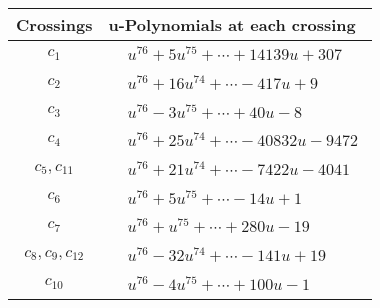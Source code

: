 \documentclass[1p]{elsarticle_modified}
\theoremstyle{definition}
\begin{document}
\begin{tabular}{m{50pt}|m{274pt}}
Crossings & \hspace{64pt}u-Polynomials at each crossing \\
\hline $$\begin{aligned}c_{1}\end{aligned}$$&$\begin{aligned}
&u^{76}+5 u^{75}+\cdots+14139 u+307
\end{aligned}$\\
\hline $$\begin{aligned}c_{2}\end{aligned}$$&$\begin{aligned}
&u^{76}+16 u^{74}+\cdots-417 u+9
\end{aligned}$\\
\hline $$\begin{aligned}c_{3}\end{aligned}$$&$\begin{aligned}
&u^{76}-3 u^{75}+\cdots+40 u-8
\end{aligned}$\\
\hline $$\begin{aligned}c_{4}\end{aligned}$$&$\begin{aligned}
&u^{76}+25 u^{74}+\cdots-40832 u-9472
\end{aligned}$\\
\hline $$\begin{aligned}c_{5},c_{11}\end{aligned}$$&$\begin{aligned}
&u^{76}+21 u^{74}+\cdots-7422 u-4041
\end{aligned}$\\
\hline $$\begin{aligned}c_{6}\end{aligned}$$&$\begin{aligned}
&u^{76}+5 u^{75}+\cdots-14 u+1
\end{aligned}$\\
\hline $$\begin{aligned}c_{7}\end{aligned}$$&$\begin{aligned}
&u^{76}+u^{75}+\cdots+280 u-19
\end{aligned}$\\
\hline $$\begin{aligned}c_{8},c_{9},c_{12}\end{aligned}$$&$\begin{aligned}
&u^{76}-32 u^{74}+\cdots-141 u+19
\end{aligned}$\\
\hline $$\begin{aligned}c_{10}\end{aligned}$$&$\begin{aligned}
&u^{76}-4 u^{75}+\cdots+100 u-1
\end{aligned}$\\
\hline
\end{tabular}\\~\\
\end{document}
